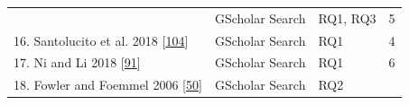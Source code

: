 \documentclass[]{book}
\begin{document}
\begin{longtable}[]{@{}llll@{}}
\begin{minipage}[t]{0.56\columnwidth}
\end{minipage} & \begin{minipage}[t]{0.18\columnwidth}\raggedright\strut
GScholar Search\strut
\end{minipage} & \begin{minipage}[t]{0.08\columnwidth}\raggedright\strut
RQ1, RQ3\strut
\end{minipage} & \begin{minipage}[t]{0.06\columnwidth}\raggedright\strut
5\strut
\end{minipage}\tabularnewline
\begin{minipage}[t]{0.56\columnwidth}\raggedright\strut
16. Santolucito et al. 2018
{[}\protect\hyperlink{ref-santolucito2018statically}{104}{]}\strut
\end{minipage} & \begin{minipage}[t]{0.18\columnwidth}\raggedright\strut
GScholar Search\strut
\end{minipage} & \begin{minipage}[t]{0.08\columnwidth}\raggedright\strut
RQ1\strut
\end{minipage} & \begin{minipage}[t]{0.06\columnwidth}\raggedright\strut
4\strut
\end{minipage}\tabularnewline
\begin{minipage}[t]{0.56\columnwidth}\raggedright\strut
17. Ni and Li 2018 {[}\protect\hyperlink{ref-ni2018acona}{91}{]}\strut
\end{minipage} & \begin{minipage}[t]{0.18\columnwidth}\raggedright\strut
GScholar Search\strut
\end{minipage} & \begin{minipage}[t]{0.08\columnwidth}\raggedright\strut
RQ1\strut
\end{minipage} & \begin{minipage}[t]{0.06\columnwidth}\raggedright\strut
6\strut
\end{minipage}\tabularnewline
\begin{minipage}[t]{0.56\columnwidth}\raggedright\strut
18. Fowler and Foemmel 2006
{[}\protect\hyperlink{ref-fowler2006continuous}{50}{]}\strut
\end{minipage} & \begin{minipage}[t]{0.18\columnwidth}\raggedright\strut
GScholar Search\strut
\end{minipage} & \begin{minipage}[t]{0.08\columnwidth}\raggedright\strut
RQ2\strut
\end{minipage} & \begin{minipage}[t]{0.06\columnwidth}\raggedright\strut

\end{minipage}
\end{longtable}
\end{document}
